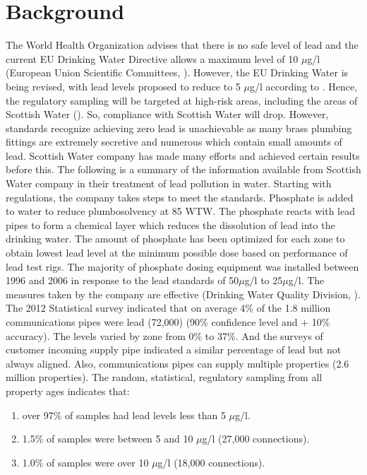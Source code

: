 \documentclass[11pt,twoside]{article}
\numberwithin{Theorem}{section}
\numberwithin{Definition}{section}
\numberwithin{Lemma}{section}
\numberwithin{Algorithm}{section}
\numberwithin{equation}{section}
\begin{document}
\section{Background}
\label{sec:background}
The World Health Organization advises that there is no safe level of lead and the current EU Drinking Water Directive allows a maximum level of 10 $\mu$g/l (European Union Scientific Committees, \citeyear{european}). However, the EU Drinking Water is being revised, with lead levels proposed to reduce to 5 $\mu$g/l according to \cite{aquatech}. Hence, the regulatory sampling will be targeted at high-risk areas, including the areas of Scottish Water (\cite{sw}). So, compliance with Scottish Water will drop. However, standards recognize achieving zero lead is unachievable as many brass plumbing fittings are extremely secretive and numerous which contain small amounts of lead.
Scottish Water company has made many efforts and achieved certain results before this. The following is a summary of the information available from Scottish Water company in their treatment of lead pollution in water.
Starting with regulations, the company takes steps to meet the standards. Phosphate is added to water to reduce plumbosolvency at 85 WTW. The phosphate reacts with lead pipes to form a chemical layer which reduces the dissolution of lead into the drinking water. The amount of phosphate has been optimized for each zone to obtain lowest lead level at the minimum possible dose based on performance of lead test rigs. The majority of phosphate dosing equipment was installed between 1996 and 2006 in response to the lead standards of 50$\mu$g/l to 25$\mu$g/l. The measures taken by the company are effective (Drinking Water Quality Division, \citeyear{drinking}). The 2012 Statistical survey indicated that on average 4\% of the 1.8 million communications pipes were lead (72,000) (90\% confidence level and + 10\% accuracy). The levels varied by zone from 0\% to 37\%. And the surveys of customer incoming supply pipe indicated a similar percentage of lead but not always aligned. Also, communications pipes can supply multiple properties (2.6 million properties). The random, statistical, regulatory sampling from all property ages indicates that:

\begin{enumerate}
\item over 97\% of samples had lead levels less than 5 $\mu$g/l.
\item 1.5\% of samples were between 5 and 10 $\mu$g/l (27,000 connections).
\item 1.0\% of samples were over 10 $\mu$g/l (18,000 connections).
\end{enumerate}
\end{document}

